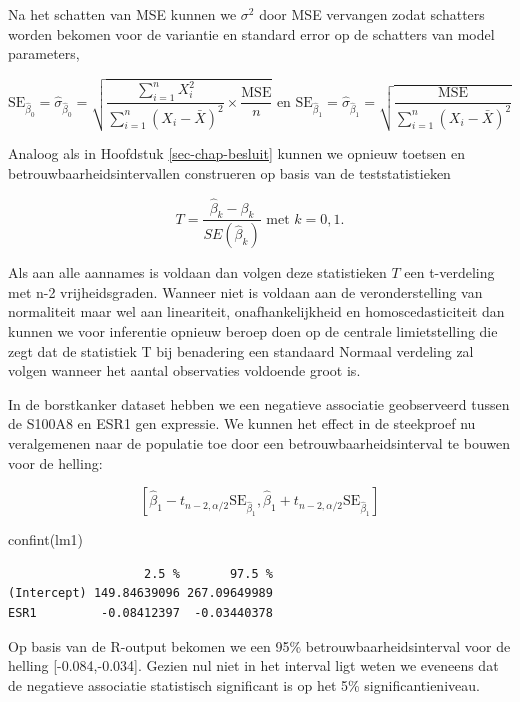 \documentclass[
  dutch,
  letterpaper,
  12pt]{book}
\newenvironment{Shaded}{\begin{snugshade}}{\end{snugshade}}
\newcommand{\FunctionTok}[1]{\textcolor[rgb]{0.28,0.35,0.67}{#1}}
\newcommand{\NormalTok}[1]{\textcolor[rgb]{0.00,0.23,0.31}{#1}}
\theoremstyle{definition}
\theoremstyle{definition}
\theoremstyle{definition}
\theoremstyle{remark}
\begin{document}
Na het schatten van MSE kunnen we \(\sigma^2\) door MSE vervangen zodat
schatters worden bekomen voor de variantie en standard error op de
schatters van model parameters,

\[\text{SE}_{\hat{\beta}_0}=\hat\sigma_{\hat{\beta}_0}=\sqrt{\frac{\sum\limits_{i=1}^n X^2_i}{\sum\limits_{i=1}^n (X_i-\bar X)^2} \times\frac{\text{MSE}}{n}} \text{ en } \text{SE}_{\hat{\beta}_1}=\hat\sigma_{\hat{\beta}_1}=\sqrt{\frac{\text{MSE}}{\sum\limits_{i=1}^n (X_i-\bar X)^2}}\]

Analoog als in Hoofdstuk \ref{sec-chap-besluit} kunnen we opnieuw
toetsen en betrouwbaarheidsintervallen construeren op basis van de
teststatistieken

\[T=\frac{\hat{\beta}_k-\beta_k}{SE(\hat{\beta}_k)} \text{ met } k=0,1.\]

Als aan alle aannames is voldaan dan volgen deze statistieken \(T\) een
t-verdeling met n-2 vrijheidsgraden. Wanneer niet is voldaan aan de
veronderstelling van normaliteit maar wel aan lineariteit,
onafhankelijkheid en homoscedasticiteit dan kunnen we voor inferentie
opnieuw beroep doen op de centrale limietstelling die zegt dat de
statistiek T bij benadering een standaard Normaal verdeling zal volgen
wanneer het aantal observaties voldoende groot is.

In de borstkanker dataset hebben we een negatieve associatie
geobserveerd tussen de S100A8 en ESR1 gen expressie. We kunnen het
effect in de steekproef nu veralgemenen naar de populatie toe door een
betrouwbaarheidsinterval te bouwen voor de helling:

\[[\hat\beta_1 - t_{n-2,\alpha/2} \text{SE}_{\hat\beta_1},\hat\beta_1 + t_{n-2,\alpha/2} \text{SE}_{\hat\beta_1}]\]

\begin{Shaded}
\begin{Highlighting}[]
\FunctionTok{confint}\NormalTok{(lm1)}
\end{Highlighting}
\end{Shaded}

\begin{verbatim}
                   2.5 %       97.5 %
(Intercept) 149.84639096 267.09649989
ESR1         -0.08412397  -0.03440378
\end{verbatim}

Op basis van de R-output bekomen we een 95\% betrouwbaarheidsinterval
voor de helling {[}-0.084,-0.034{]}. Gezien nul niet in het interval
ligt weten we eveneens dat de negatieve associatie statistisch
significant is op het 5\% significantieniveau.
\end{document}
